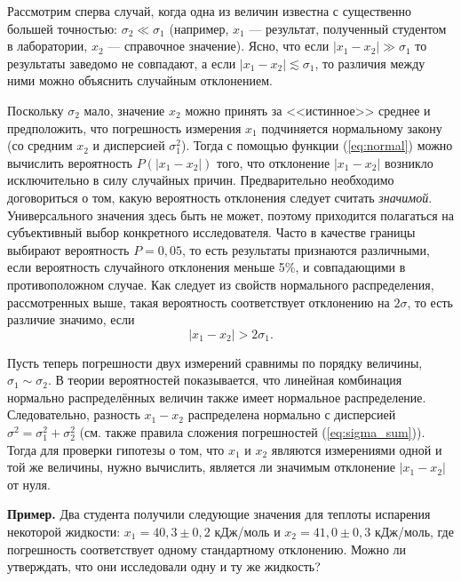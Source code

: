 Рассмотрим сперва случай, когда одна из величин известна с существенно
большей точностью: $\sigma_{2}\ll\sigma_{1}$ (например, $x_{1}$
--- результат, полученный студентом в лаборатории, $x_{2}$
--- справочное значение). Ясно, что если $\left|x_{1}-x_{2}\right|\gg\sigma_{1}$
то результаты заведомо не совпадают, а если $\left|x_{1}-x_{2}\right|\lesssim\sigma_{1}$,
то различия между ними можно объяснить случайным отклонением.

Поскольку $\sigma_{2}$ мало, значение $x_{2}$ можно принять за <<истинное>>
среднее и предположить, что погрешность измерения $x_{1}$ подчиняется
нормальному закону (со средним $x_{2}$ и дисперсией $\sigma_{1}^{2}$).
Тогда с помощью функции (\ref{eq:normal}) можно вычислить вероятность
$P\left(\left|x_{1}-x_{2}\right|\right)$ того, что отклонение $\left|x_{1}-x_{2}\right|$
возникло исключительно в силу случайных причин. Предварительно необходимо
договориться о том, какую вероятность отклонения следует считать \emph{значимой}.
Универсального значения здесь быть не может, поэтому приходится полагаться
на субъективный выбор конкретного исследователя. Часто в качестве
границы выбирают вероятность $P=0{,}05$, то есть результаты признаются
различными, если вероятность случайного отклонения меньше 5\%, и совпадающими
в противоположном случае. Как следует из свойств нормального распределения,
рассмотренных выше, такая вероятность соответствует отклонению на
$2\sigma$, то есть различие значимо, если 
\[
\left|x_{1}-x_{2}\right|>2\sigma_{1}.
\]

Пусть теперь погрешности двух измерений сравнимы по порядку величины,
$\sigma_{1}\sim\sigma_{2}$. В теории вероятностей показывается, что
линейная комбинация нормально распределённых величин также имеет нормальное
распределение. Следовательно, разность $x_{1}-x_{2}$ распределена
нормально с дисперсией $\sigma^{2}=\sigma_{1}^{2}+\sigma_{2}^{2}$
(см. также правила сложения погрешностей (\ref{eq:sigma_sum})). Тогда
для проверки гипотезы о том, что $x_{1}$ и $x_{2}$ являются измерениями
одной и той же величины, нужно вычислить, является ли значимым отклонение
$\left|x_{1}-x_{2}\right|$ от нуля.

\textbf{\footnotesize{}Пример.}{\footnotesize{} Два студента получили
следующие значения для теплоты испарения некоторой жидкости: $x_{1}=40{,}3\pm0{,}2$
кДж/моль и $x_{2}=41{,}0\pm0{,}3$ кДж/моль, где погрешность соответствует
одному стандартному отклонению. Можно ли утверждать, что они исследовали
одну и ту же жидкость?}{\footnotesize\par}

